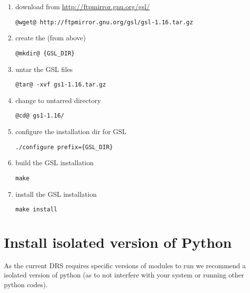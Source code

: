 \begin{enumerate}
\item download from \url{http://ftpmirror.gnu.org/gsl/}

\begin{lstlisting}[style=bashstyle]
@wget@ http://ftpmirror.gnu.org/gsl/gsl-1.16.tar.gz
\end{lstlisting}

\item create the  (from above)
\begin{lstlisting}[style=bashstyle]
@mkdir@ {GSL_DIR}
\end{lstlisting}

\item untar the GSL files
\begin{lstlisting}[style=bashstyle]
@tar@ -xvf gs1-1.16.tar.gz
\end{lstlisting}

\item change to untarred directory
\begin{lstlisting}[style=bashstyle]
@cd@ gs1-1.16/
\end{lstlisting}

\item configure the installation dir for GSL
\begin{lstlisting}[style=bashstyle]
./configure prefix={GSL_DIR}
\end{lstlisting}

\item build the GSL installation
\begin{lstlisting}[style=bashstyle]
make
\end{lstlisting}

\item install the GSL installation
\begin{lstlisting}[style=bashstyle]
make install
\end{lstlisting}

\end{enumerate}

\section{Install isolated version of Python}
\label{section:install-python}

As the current DRS requires specific versions of modules to run we recommend a isolated version of python (as to not interfere with your system or running other python codes). 

